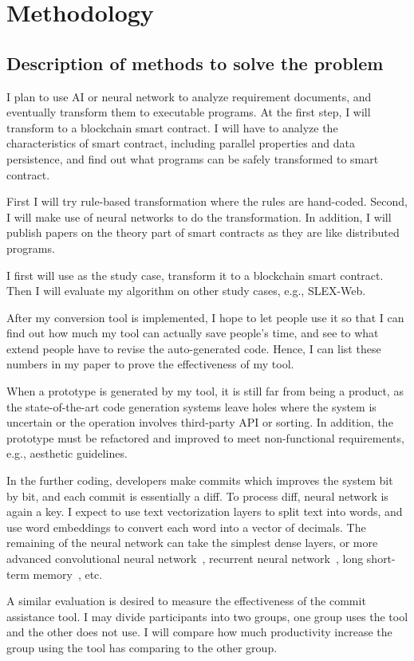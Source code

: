 \chapter{Methodology}


\section{Description of methods to solve the problem}

I plan to use AI or neural network to analyze requirement documents, and eventually transform them to executable programs.
At the first step, I will transform to a blockchain smart contract.
I will have to analyze the characteristics of smart contract, including parallel properties and data persistence, and find out what programs can be safely transformed to smart contract.

First I will try rule-based transformation where the rules are hand-coded. Second, I will make use of neural networks to do the transformation. In addition, I will publish papers on the theory part of smart contracts as they are like distributed programs.

I first will use {\cocome} as the study case, transform it to a blockchain smart contract. Then I will evaluate my algorithm on other study cases, e.g., SLEX-Web.

After my conversion tool is implemented, I hope to let people use it so that I can find out how much my tool can actually save people's time, and see to what extend people have to revise the auto-generated code. Hence, I can list these numbers in my paper to prove the effectiveness of my tool.

When a prototype is generated by my tool, it is still far from being a product, as the state-of-the-art code generation systems leave holes where the system is uncertain or the operation involves  third-party API or sorting. In addition, the prototype must be refactored and improved to meet non-functional requirements, e.g., aesthetic guidelines.

In the further coding, developers make commits which improves the system bit by bit, and each commit is essentially a diff. To process diff, neural network is again a key. I expect to use text vectorization layers to split text into words, and use word embeddings to convert each word into a vector of decimals.
The remaining of the neural network can take the simplest dense layers, or more advanced convolutional neural network~\cite{albawi2017understanding}, recurrent neural network~\cite{tarwani2017survey}, long short-term memory~\cite{skovajsova2017long}, etc.

A similar evaluation is desired to measure the effectiveness of the commit assistance tool. I may divide participants into two groups, one group uses the tool and the other does not use. I will compare how much productivity increase the group using the tool has comparing to the other group.


